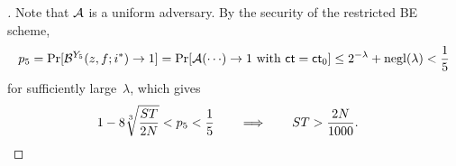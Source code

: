 \begin{proof}[]
Note that ${\mathcal{A}}$ is a uniform adversary.
By the security of the restricted BE scheme,
\begin{align*}
p_5
=\Pr[\scriptB^{Y_5}(z,f;i^\ast)\to 1]
=\Pr[\scriptA({\cdots})\to 1\textup{ with }\ct=\ct_0]
\leq 2^{-\lambda}+\negl(\lambda)
<\frac15
\end{align*}
for sufficiently large~$\lambda$, which gives
\begin{align*}
1-8\sqrt[3]{\frac{ST}{2N}}<p_5<\frac15
&
\qquad\Longrightarrow\qquad
ST>\frac{2N}{1000}.
\qedhere
\end{align*}
\end{proof}
